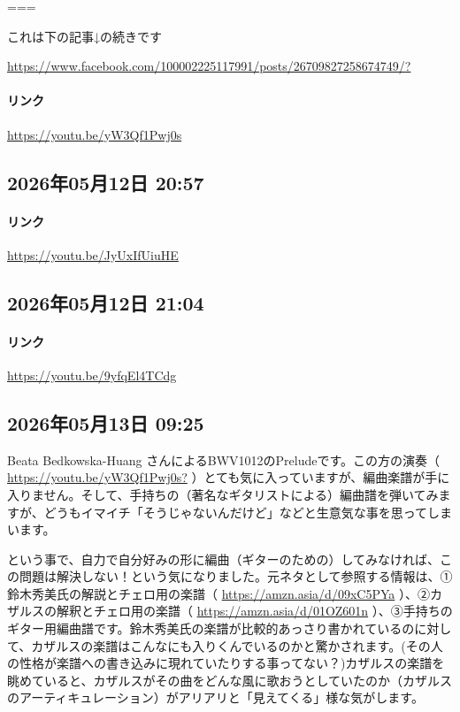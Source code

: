 ===

これは下の記事↓の続きです

\url{https://www.facebook.com/100002225117991/posts/26709827258674749/?}

\paragraph{リンク}
\url{https://youtu.be/yW3Qf1Pwj0s}

\subsection*{2026年05月12日 20:57}

\paragraph{リンク}
\url{https://youtu.be/JyUxIfUiuHE}

\subsection*{2026年05月12日 21:04}

\paragraph{リンク}
\url{https://youtu.be/9yfqEl4TCdg}

\subsection*{2026年05月13日 09:25}

Beata Bedkowska-Huang さんによるBWV1012のPreludeです。この方の演奏（ \url{https://youtu.be/yW3Qf1Pwj0s?} ）とても気に入っていますが、編曲楽譜が手に入りません。そして、手持ちの（著名なギタリストによる）編曲譜を弾いてみますが、どうもイマイチ「そうじゃないんだけど」などと生意気な事を思ってしまいます。

という事で、自力で自分好みの形に編曲（ギターのための）してみなければ、この問題は解決しない！という気になりました。元ネタとして参照する情報は、①鈴木秀美氏の解説とチェロ用の楽譜（ \url{https://amzn.asia/d/09xC5PYa} ）、②カザルスの解釈とチェロ用の楽譜（ \url{https://amzn.asia/d/01OZ601n} ）、③手持ちのギター用編曲譜です。鈴木秀美氏の楽譜が比較的あっさり書かれているのに対して、カザルスの楽譜はこんなにも入りくんでいるのかと驚かされます。(その人の性格が楽譜への書き込みに現れていたりする事ってない？)カザルスの楽譜を眺めていると、カザルスがその曲をどんな風に歌おうとしていたのか（カザルスのアーティキュレーション）がアリアリと「見えてくる」様な気がします。

